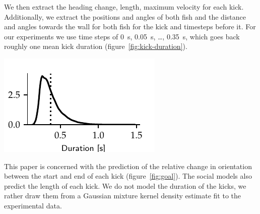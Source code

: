 \documentclass[nobib, a4paper]{tufte-handout}
\begin{document}
We then extract the heading change, length, maximum velocity for each kick.
Additionally, we extract the positions and angles of both fish and the distance and angles towards the wall for both fish for the kick and timesteps before it.
For our experiments we use time steps of \SI{0}{\s}, \SI{0.05}{s}, \ldots, \SI{0.35}{\s}, which goes back roughly one mean kick duration (figure~\ref{fig:kick-duration}).
\begin{marginfigure}
\includegraphics{kick_duration}
\caption{Kernel density estimate of training kick duration.
Dotted line is the mean duration at \SI{0.37}{\s}.}
\label{fig:kick-duration}
\end{marginfigure}


\begin{marginfigure}
    \centering
{} 
\caption{Heading change from grey heading to red heading.}
\label{fig:goal}
\end{marginfigure}

This paper is concerned with the prediction of the relative change in orientation between the start and end of each kick (figure~\ref{fig:goal}).
The social models also predict the length of each kick.
We do not model the duration of the kicks, we rather draw them from a Gaussian mixture kernel density estimate fit to the experimental data.
\end{document}
